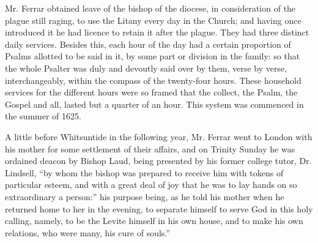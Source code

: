 Mr. Ferrar obtained leave of the bishop of the
diocese, in consideration of the plague still raging, to use the Litany
every day in the Church; and having once introduced it he had licence to
retain it after the plague. They had three distinct daily services.
Besides this, each hour of the day had a certain proportion of Psalms
allotted to be said in it, by some part or division in the family: so
that the whole Psalter was duly and devoutly said over by them, verse by
verse, interchangeably, within the compass of the twenty-four hours.
These household services for the different hours were so framed that the
collect, the Psalm, the Gospel and all, lasted but a quarter of an hour.
This system was commenced in the summer of 1625.

A little before Whitsuntide in the following year,
Mr. Ferrar went to London with his mother for some settlement of their
affairs, and on Trinity Sunday he was ordained deacon by Bishop Laud,
being presented by his former college tutor, Dr. Lindsell, ``by whom the
bishop was prepared to receive him with tokens of particular esteem, and
with a great deal of joy that he was to lay hands on so extraordinary a
person:'' his purpose being, as he told his mother when he returned home
to her in the evening, to separate himself to serve God in this holy
calling, namely, to be the Levite himself in his own house, and to make
his own relations, who were many, his cure of souls.''

